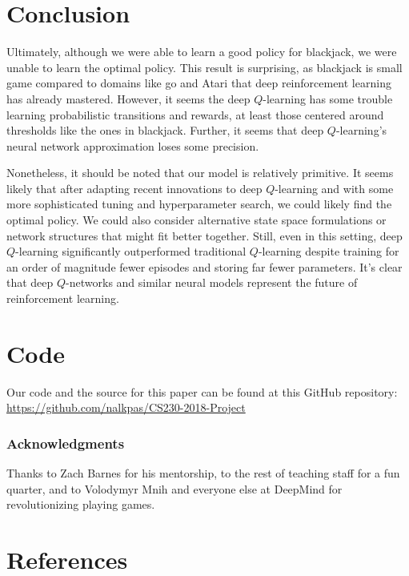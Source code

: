 \documentclass{article}
\begin{document}
\section{Conclusion}

Ultimately, although we were able to learn a good policy for blackjack, we were unable to learn the optimal policy. This result is surprising, as blackjack is small game compared to domains like go and Atari that deep reinforcement learning has already mastered. However, it seems the deep $Q$-learning has some trouble learning probabilistic transitions and rewards, at least those centered around thresholds like the ones in blackjack. Further, it seems that deep $Q$-learning's neural network approximation loses some precision. 

Nonetheless, it should be noted that our model is relatively primitive. It seems likely that after adapting recent innovations to deep $Q$-learning and with some more sophisticated tuning and hyperparameter search, we could likely find the optimal policy. We could also consider alternative state space formulations or network structures that might fit better together. Still, even in this setting, deep $Q$-learning significantly outperformed traditional $Q$-learning despite training for an order of magnitude fewer episodes and storing far fewer parameters. It's clear that deep $Q$-networks and similar neural models represent the future of reinforcement learning. 

\section{Code}

Our code and the source for this paper can be found at this GitHub repository: \url{https://github.com/nalkpas/CS230-2018-Project}

\subsubsection*{Acknowledgments}

Thanks to Zach Barnes for his mentorship, to the rest of teaching staff for a fun quarter, and to Volodymyr Mnih and everyone else at DeepMind for revolutionizing playing games. 

\section*{References}

\small
\end{document}
